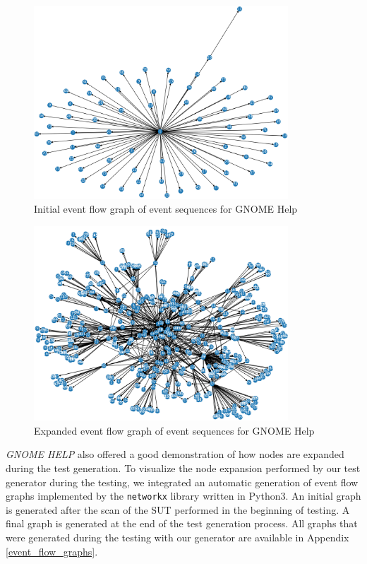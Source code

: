 \begin{figure}[htb!]
	\centering
	\includegraphics[width=0.85\textwidth,clip]{obrazky-figures/yelp_n_start.png}
	\caption{Initial event flow graph of event sequences for GNOME Help}
	\label{yelp_start}
\end{figure}

\begin{figure}[htb!]
	\centering
	\includegraphics[width=0.85\textwidth,clip]{obrazky-figures/yelp_n_final.png}
	\caption{Expanded event flow graph of event sequences for GNOME Help}
	\label{yelp_end}
\end{figure}

\textit{GNOME HELP} also offered a good demonstration of how nodes are expanded during the test generation. To visualize the node expansion performed by our test generator during the testing, we integrated an automatic generation of event flow graphs implemented by the \texttt{networkx} library written in Python3. An initial graph is generated after the scan of the SUT performed in the beginning of testing. A final graph is generated at the end of the test generation process. All graphs that were generated during the testing with our generator are available in Appendix \ref{event_flow_graphs}.

